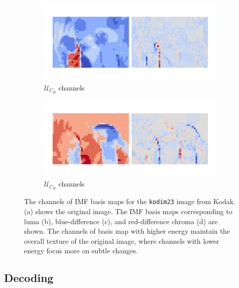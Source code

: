 \begin{figure}[!t]
\begin{minipage}{0.32\textwidth}
        \centering
        \begin{subfigure}{\textwidth}
            \centering
            \includegraphics[width=.95\textwidth]{figures/kodim23_cb_components.pdf}
            \vspace{-10pt}
            \caption{$\bm{\mathcal{U}}_{C_B}$ channels}
        \end{subfigure}
        \begin{subfigure}{\textwidth}
            \centering
            \includegraphics[width=.95\textwidth]{figures/kodim23_cr_components.pdf}
            \vspace{-10pt}
            \caption{$\bm{\mathcal{U}}_{C_R}$ channels}
        \end{subfigure}
    \end{minipage}
    \caption{The channels of IMF basis maps for the \texttt{kodim23} image from Kodak. (a) shows the original image. The IMF basis maps corresponding to luma (b), blue-difference (c), and red-difference chroma (d) are shown. The channels of basis map with higher energy maintain the overall texture of the original image, where channels with lower energy focus more on subtle changes.}
    \label{fig:imf_components}
\end{figure}


\subsection{Decoding} \label{sec:decoding}

